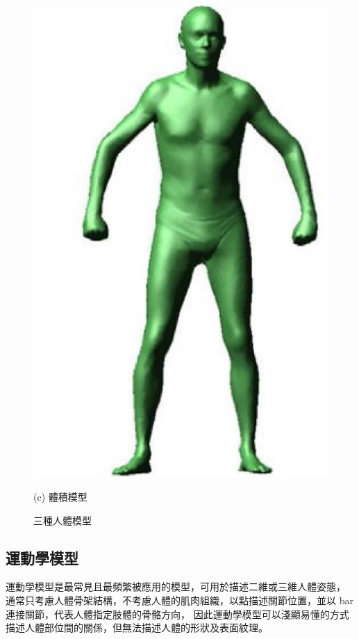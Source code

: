 \begin{figure}[!ht]
\begin{minipage}{.33\textwidth}
      \includegraphics[width=.95\linewidth]{figure/ch2_fig_personal_planar_model.png}
      \caption*{(c) 體積模型}
    \end{minipage}
    \captionsetup{justification=centering}
    \caption[三種人體模型~\cite{gong2016human}]{三種人體模型~\cite{gong2016human}}
    \label{ch2_fig_personal_model}
 \end{figure}

\subsection*{運動學模型}
運動學模型是最常見且最頻繁被應用的模型，可用於描述二維或三維人體姿態，
通常只考慮人體骨架結構，不考慮人體的肌肉組織，以點描述關節位置，並以 bar 連接關節，代表人體指定肢體的骨骼方向，
因此運動學模型可以淺顯易懂的方式描述人體部位間的關係，但無法描述人體的形狀及表面紋理。

